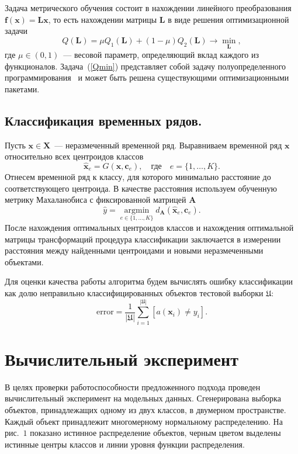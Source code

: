 Задача метрического обучения состоит в нахождении линейного преобразования $\mathbf{f}(\mathbf{x}) = \mathbf{Lx}$, то есть нахождении матрицы $\mathbf{L}$ в виде решения оптимизационной задачи
\begin{equation}
\label{Qmin}
Q(\mathbf{L}) = \mu Q_1(\mathbf{L}) + (1 - \mu) Q_2(\mathbf{L}) \rightarrow \min_{\mathbf{L}},
\end{equation}
где $\mu \in (0, 1)$~--- весовой параметр, определяющий вклад каждого из функционалов.
Задача~(\ref{Qmin}) представляет собой задачу полуопределенного программирования~\cite{vandenberghe1996semidefinite} и может быть решена существующими оптимизационными пакетами.

\subsection{Классификация временных рядов.}

Пусть $\mathbf{x} \in \mathbf{X}$~--- неразмеченный временной ряд. Выравниваем временной ряд $\mathbf{x}$ относительно всех центроидов классов
\[
\mathbf{\hat{x}}_e = G(\mathbf{x}, \mathbf{c}_e), \quad \text{где} \quad e = \{1, \dots, K\}.
\]
Отнесем временной ряд к классу, для которого минимально расстояние до соответствующего центроида. В качестве расстояния используем обученную метрику Махаланобиса с фиксированной матрицей $\mathbf{A}$
\[
\hat{y} = \mathop{\text{argmin}}\limits_{e \in \{1, \dots, K\}}d_\mathbf{A}(\mathbf{\hat{x}}_e, \mathbf{c}_e).
\]
После нахождения оптимальных центроидов классов и нахождения оптимальной матрицы трансформаций процедура классификации заключается в измерении расстояния между найденными центроидами и новыми неразмеченными объектами.

Для оценки качества работы алгоритма будем вычислять ошибку классификации как долю неправильно классифицированных объектов тестовой выборки $\mathfrak{U}$:
\[
\text{error} = \frac1{|\mathfrak{U}|} \sum_{i = 1} ^ {|\mathfrak{U}|} [a(\mathbf{x}_i) \ne y_i].
\]


\section{Вычислительный эксперимент}
В целях проверки работоспособности предложенного подхода проведен вычислительный эксперимент на модельных данных. Сгенерирована выборка объектов, принадлежащих одному из двух классов, в двумерном пространстве.
Каждый объект принадлежит многомерному нормальному распределению.
На рис.~$1$ показано истинное распределение объектов, черным цветом выделены истинные центры классов и линии уровня функции распределения.


